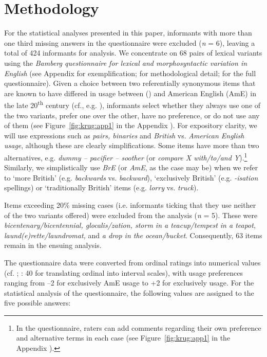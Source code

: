 \documentclass[output=paper]{langsci/langscibook}
\begin{document}
\section{Methodology}

For the statistical analyses presented in this paper, informants with
more than one third missing answers in the questionnaire were excluded
(\textit{n} = 6), leaving a total of 424 informants for analysis. We
concentrate on 68 pairs of lexical variants using the \textit{Bamberg
  questionnaire for lexical and morphosyntactic variation in English}
(see Appendix for exemplification; \citealt{KrugSell2013} for
methodological detail; \citealt{KrugetalF}
  for the full questionnaire). Given a choice between two
  referentially synonymous items that are known to have differed in
  usage between  () and American English (AmE) in
  the late 20\textsuperscript{th} century (cf.,
  e.g. \citealt{Algeo2006}), informants select whether they always use
  one of the two variants, prefer one over the other, have no
  preference, or do not use any of them (see Figure~\ref{fig:krug:app1} in the Appendix%
  ). For
  expository clarity, we will use expressions such as \textit{pairs,
    binaries} and \textit{British} vs. \textit{American English
    usage}, although these are clearly simplifications. Some items
  have more than two alternatives, e.g. \textit{dummy – pacifier –
    soother} (or \textit{compare X with/to/and Y}).\footnote{In the
    questionnaire, raters can add comments regarding their own
    preference and alternative terms in each case (see Figure~\ref{fig:krug:app1} in the Appendix%
    ).}
  Similarly, we simplistically use \textit{BrE} (or \textit{AmE}, as
  the case may be) when we refer to ‘more British’
  (e.g. \textit{backwards} vs. \textit{backward}), ‘exclusively
  British’ (e.g. \textit{-isation} spellings) or ‘traditionally
  British’ items (e.g. \textit{lorry} vs. \textit{truck}).

Items exceeding 20\% missing cases (i.e. informants ticking that they use neither of the two variants offered) were excluded from the analysis (\textit{n} = 5). These were \textit{bicentenary/bicentennial, glocalis/zation, storm in a teacup/tempest in a tea\-pot}, \textit{laund(e)rette/laundromat,} and \textit{a drop in the ocean/bucket}. Consequently, 63 items remain in the ensuing analysis.

The questionnaire data were converted from ordinal ratings into numerical values (cf. \citealt{Rohrmann2007}; \citealt{AgrestiFinlay2009}: 40 for translating ordinal into interval scales), with usage preferences ranging from --2 for exclusively AmE usage to +2 for exclusively  usage. For the statistical analysis of the questionnaire, the following values are assigned to the five possible answers:
\end{document}
